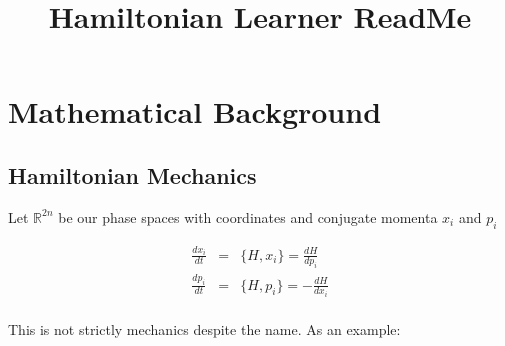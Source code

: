 \documentclass[a4paper,landscape]{article}
\title{Hamiltonian Learner ReadMe}
\theoremstyle{change}
\theoremstyle{nonumberplain}
\numberwithin{equation}{section}
\newcommand\setof[1]{\{ #1 \}}
\begin{document}
\maketitle

\section{Mathematical Background}

\subsection{Hamiltonian Mechanics}

Let $\mathbb{R}^{2n}$ be our phase spaces with coordinates and conjugate momenta $x_i$ and $p_i$

\begin{eqnarray*}
\frac{dx_i}{dt} &=& \setof{H,x_i} = \frac{dH}{dp_i}\\
\frac{dp_i}{dt} &=& \setof{H,p_i} = - \frac{dH}{dx_i}\\
\end{eqnarray*}

This is not strictly mechanics despite the name. As an example:
\end{document}
